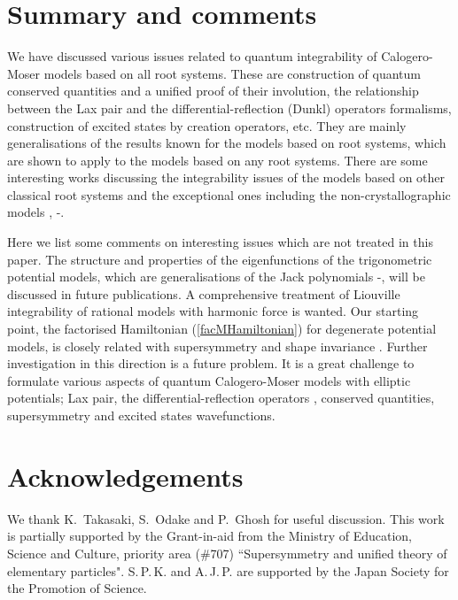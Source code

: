 \documentclass[a4paper,12pt]{article}
\begin{document}

\section{Summary and comments}
\label{comdis}
\setcounter{equation}{0}
We have discussed various issues related to quantum integrability of
Calogero-Moser models based on all root systems.
These are construction of quantum conserved quantities and a unified proof
of their involution, the relationship between the Lax pair  and
the differential-reflection (Dunkl) operators formalisms, construction of
excited states by creation operators, etc.
They are mainly generalisations of the results known for the models
based on \coordHE{} root systems, which are shown to apply to the
models based on any root systems.
There are some interesting works discussing the integrability issues
of the models based on other classical root systems and the exceptional
ones including the non-crystallographic models
\cite{G2sep}, \cite{G2new}-\cite{Kha}.

Here we list some comments on interesting issues which are not treated in
this paper.
The structure and properties of the eigenfunctions of the trigonometric
potential models, which are generalisations of the Jack polynomials
\cite{Stan}-\cite{Awat}, will be discussed in future publications.
A comprehensive treatment of Liouville integrability of
rational models with harmonic force is wanted.
Our starting point, the factorised Hamiltonian (\ref{facMHamiltonian})
for degenerate potential models, is closely related with supersymmetry
and shape invariance \cite{Eft,Kha}. Further investigation in this
direction is a future problem.
It is a great challenge to formulate various aspects of
quantum Calogero-Moser models with elliptic potentials;
Lax pair, the differential-reflection operators \cite{Cher,Oshima},
conserved quantities, supersymmetry and excited states wavefunctions.

\section*{Acknowledgements}
\setcounter{equation}{0}
We thank K.\, Takasaki, S.\, Odake and P.\, Ghosh for useful discussion.
This work is partially supported  by the Grant-in-aid from
the   Ministry of Education, Science and Culture,
priority area (\#707)  ``Supersymmetry and unified theory of elementary
particles". S.\,P.\,K. and A.\,J.\,P. are supported by the
Japan Society for the
Promotion of Science.
\end{document}
